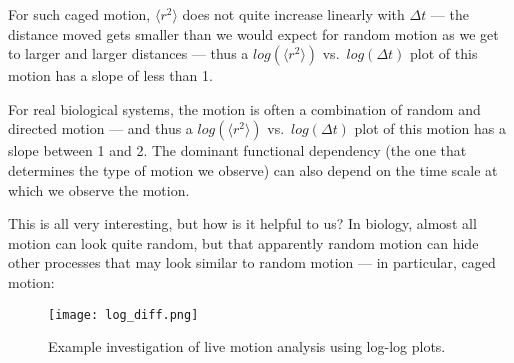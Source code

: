 For such caged motion, $\langle r^{2} \rangle$ does not quite increase linearly with $\Delta t$ — the distance moved gets smaller than we would expect for random motion as we get to larger and larger distances — thus a $log(\langle r^{2} \rangle)$ vs.\ $log(\Delta t)$ plot of this motion has a slope of less than 1.
 \par
For real biological systems, the motion is often a combination of random and directed motion — and thus a $log(\langle r^{2} \rangle)$ vs.\ $log(\Delta t)$ plot of this motion has a slope between 1 and 2. 
The dominant functional dependency (the one that determines the type of motion we observe) can also depend on the time scale at which we observe the motion.
\par
This is all very interesting, but how is it helpful to us?
In biology, almost all motion can look quite random, but that apparently random motion can hide other processes that may look similar to random motion — in particular, caged motion:

\begin{figure}[h!]
	\centering
	\texttt{[image: log\_diff.png]}
	\caption{Example investigation of live motion analysis using log-log plots.}
	\label{fig:log-diff}
\end{figure}

